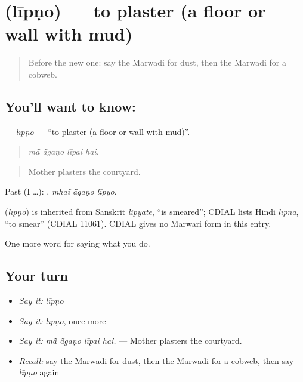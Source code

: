 \section[\texorpdfstring{\mw{लीपणो} (līpṇo)}{लीपणो (līpṇo)}]{ (līpṇo) — to plaster (a floor or wall with mud)}

\label{lesson:MW-C172-lipno}



\begin{quote}
Before the new one: say the Marwadi for dust, then the Marwadi for a cobweb.
\end{quote}

\subsection*{You'll want to know: }
\textbf{} — \emph{līpṇo} — \textquotedblleft{}to plaster (a floor or wall with mud)\textquotedblright{}.

\begin{quote}
   
\end{quote}

\begin{quote}
\emph{mā̃ ā̃gaṇo līpai hai.}
\end{quote}

\begin{quote}
Mother plasters the courtyard.
\end{quote}

Past (I …):   , \emph{mhaĩ ā̃gaṇo līpyo}.

\begin{cousinweb}
\textbf{} (\emph{līpṇo}) is inherited from Sanskrit \emph{lipyate}, \textquotedblleft{}is smeared\textquotedblright{}; CDIAL lists Hindi \emph{līpnā}, \textquotedblleft{}to smear\textquotedblright{} (CDIAL 11061). CDIAL gives no Marwari form in this entry.
\end{cousinweb}

\begin{grammarlens}[title={What you've built}]
One more word for saying what you do.
\end{grammarlens}

\subsection*{Your turn}
\begin{itemize}
\raggedright
  \item \emph{Say it:} \emph{līpṇo}
  \item \emph{Say it:} \emph{līpṇo}, once more
  \item \emph{Say it:} \emph{mā̃ ā̃gaṇo līpai hai.} — Mother plasters the courtyard.
  \item \emph{Recall:} say the Marwadi for dust, then the Marwadi for a cobweb, then say \emph{līpṇo} again
\end{itemize}

